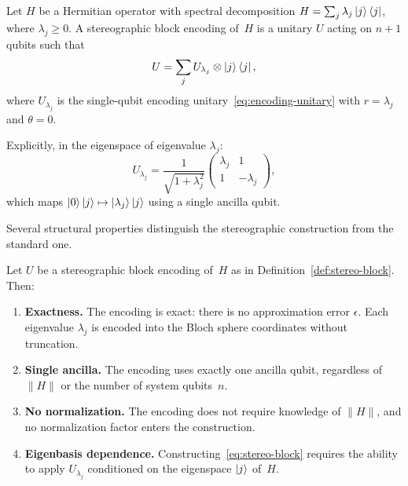 \begin{definition}
	\label{def:stereo-block}
	Let $H$ be a Hermitian operator with spectral decomposition
	$H = \sum_j \lambda_j \ket{j}\bra{j}$, where
	$\lambda_j \geq 0$.  A stereographic block encoding of~$H$
	is a unitary $U$ acting on $n + 1$ qubits such that
	\begin{equation}
		U = \sum_j U_{\lambda_j} \otimes \ket{j}\bra{j},
		\label{eq:stereo-block}
	\end{equation}
	where $U_{\lambda_j}$ is the single-qubit encoding
	unitary~\eqref{eq:encoding-unitary} with $r = \lambda_j$
	and $\theta = 0$.
\end{definition}

Explicitly, in the eigenspace of eigenvalue $\lambda_j$:
\begin{equation}
	U_{\lambda_j} = \frac{1}{\sqrt{1+\lambda_j^2}}
	\begin{pmatrix} \lambda_j & 1 \\ 1 & -\lambda_j \end{pmatrix},
	\label{eq:encoding-eigenspace}
\end{equation}
which maps $\ket{0}\ket{j} \mapsto \ket{\lambda_j}\ket{j}$
using a single ancilla qubit.

Several structural properties distinguish the stereographic
construction from the standard one.

\begin{proposition}
	\label{prop:stereo-properties}
	Let $U$ be a stereographic block encoding of~$H$ as in
	Definition~\ref{def:stereo-block}.  Then:
	\begin{enumerate}
		\item \textbf{Exactness.}  The encoding is exact:
		      there is no approximation error $\epsilon$.
		      Each eigenvalue $\lambda_j$ is encoded into
		      the Bloch sphere coordinates without
		      truncation.
		\item \textbf{Single ancilla.}  The encoding uses
		      exactly one ancilla qubit, regardless of
		      $\|H\|$ or the number of system qubits~$n$.
		\item \textbf{No normalization.}  The encoding does
		      not require knowledge of $\|H\|$, and no
		      normalization factor enters the construction.
		\item \textbf{Eigenbasis dependence.}
		      Constructing~\eqref{eq:stereo-block} requires
		      the ability to apply $U_{\lambda_j}$
		      conditioned on the eigenspace $\ket{j}$
		      of~$H$.
	\end{enumerate}
\end{proposition}

